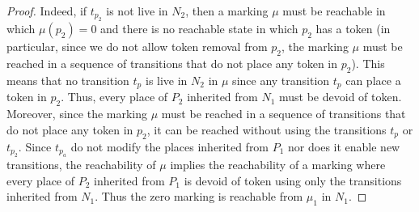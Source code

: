 \documentclass[runningheads]{llncs}
\begin{document}
\begin{proof}
Indeed, if $t_{p_2}$ is not live in $N_2$, then a marking $\mu$ must be reachable in which $\mu(p_2) = 0$ and there is no reachable state in which $p_2$ has a token (in particular, since we do not allow token removal from $p_2$, the marking $\mu$ must be reached in a sequence of transitions that do not place any token in $p_2$).
This means that no transition $t_p$ is live in $N_2$ in $\mu$ since any transition $t_p$ can place a token in $p_2$. 
Thus, every place of $P_2$ inherited from $N_1$ must be devoid of token. Moreover, since the marking $\mu$ must be reached  in a sequence of transitions that do not place any token in $p_2$, 
it can be reached without using the transitions $t_p$ or $t_{p_2}$. Since $t_{p_a}$ do not modify the places inherited from $P_1$ nor does it enable new transitions, the reachability of $\mu$ implies the reachability of a marking where every place of $P_2$ inherited from $P_1$ is devoid of token using only the transitions inherited from $N_1$. Thus the zero marking is reachable from $\mu_1$ in $N_1$.
\end{proof}
\end{document}
